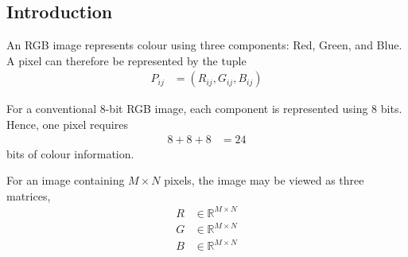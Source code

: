 
\makeatletter

\renewcommand{\thesection}{\Alph{section}}
\renewcommand{\thesubsection}{\thesection.\arabic{subsection}}
\renewcommand{\thesubsubsection}{\thesubsection.\arabic{subsubsection}}

\renewcommand{\@seccntformat}[1]{\csname the#1\endcsname\quad}

\renewcommand\section{\@startsection{section}{1}{\z@}%
  {-3.5ex \@plus -1ex \@minus -.2ex}%
  {2.3ex \@plus .2ex}%
  {\normalfont\Large\mdseries\upshape}}

\renewcommand\subsubsection{\@startsection{subsubsection}{3}{\z@}%
  {-3.25ex\@plus -1ex \@minus -.2ex}%
  {1.2ex \@plus .2ex}%
  {\normalfont\normalsize\mdseries\upshape}}

\renewcommand{\theequation}{%
  \thesection.\arabic{subsection}.%
  \ifnum\value{subsubsection}>0
    \arabic{subsubsection}.\fi\arabic{equation}}

\makeatother

\subsection{Introduction}

An RGB image represents colour using three components: Red, Green, and
Blue. A pixel can therefore be represented by the tuple
\begin{align}
P_{ij} &= (R_{ij},G_{ij},B_{ij})\label{eq:app_rgb_pixel}
\end{align}

For a conventional 8-bit RGB image, each component is represented using
8 bits. Hence, one pixel requires
\begin{align}
8+8+8 &= 24\label{eq:app_rgb_bits}
\end{align}
bits of colour information.

For an image containing $M\times N$ pixels, the image may be viewed as
three matrices,
\begin{align}
R&\in\mathbb{R}^{M\times N}\label{eq:app_r_matrix}\\
G&\in\mathbb{R}^{M\times N}\label{eq:app_g_matrix}\\
B&\in\mathbb{R}^{M\times N}\label{eq:app_b_matrix}
\end{align}

